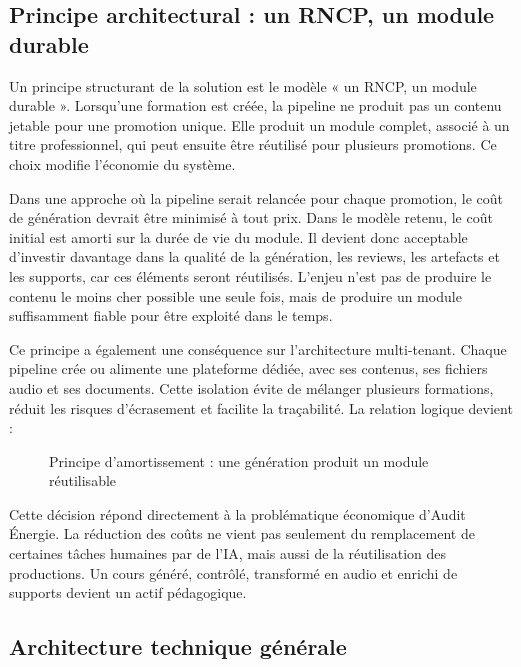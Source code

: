 \subsection{Principe architectural : un RNCP, un module durable}

Un principe structurant de la solution est le modèle « un RNCP, un module durable ».
Lorsqu'une formation est créée, la pipeline ne produit pas un contenu jetable pour une
promotion unique. Elle produit un module complet, associé à un titre professionnel, qui
peut ensuite être réutilisé pour plusieurs promotions. Ce choix modifie l'économie du
système.

Dans une approche où la pipeline serait relancée pour chaque promotion, le coût de
génération devrait être minimisé à tout prix. Dans le modèle retenu, le coût initial est
amorti sur la durée de vie du module. Il devient donc acceptable d'investir davantage dans
la qualité de la génération, les reviews, les artefacts et les supports, car ces éléments
seront réutilisés. L'enjeu n'est pas de produire le contenu le moins cher possible une seule
fois, mais de produire un module suffisamment fiable pour être exploité dans le temps.

Ce principe a également une conséquence sur l'architecture multi-tenant. Chaque pipeline
crée ou alimente une plateforme dédiée, avec ses contenus, ses fichiers audio et ses
documents. Cette isolation évite de mélanger plusieurs formations, réduit les risques
d'écrasement et facilite la traçabilité. La relation logique devient :

\begin{figure}[h]
\centering
{}
\caption{Principe d'amortissement : une génération produit un module réutilisable}
\end{figure}

Cette décision répond directement à la problématique économique d'Audit Énergie. La
réduction des coûts ne vient pas seulement du remplacement de certaines tâches humaines
par de l'IA, mais aussi de la réutilisation des productions. Un cours généré, contrôlé,
transformé en audio et enrichi de supports devient un actif pédagogique.

\subsection{Architecture technique générale}


